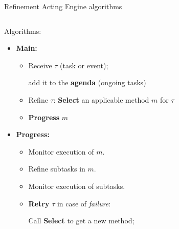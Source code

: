 \begin{frame}{Refinement Acting Engine algorithms}
    \begin{columns}[T]
  
        \begin{column}{0.65\textwidth}
            
            Algorithms:
            \small
            \begin{itemize}
                \setlength{\leftmargini}{-1pt}
                \item \textbf{Main:} 
                \begin{itemize}
                    \item Receive $\tau$ (task or event);
                    
                    add it to the \textbf{agenda} (ongoing tasks)
                    \item Refine $\tau$: \textbf{Select} an applicable method $m$ for $\tau$
                    \item \textbf{Progress} $m$
                \end{itemize}
                \item \textbf{Progress:}
                    \begin{itemize}
                        \item Monitor execution of $m$.
                        \item Refine subtasks in $m$.    
                        \item Monitor execution of subtasks.
                        \item \textbf{Retry} $\tau$ in case of \emph{failure}:
                    
                    Call \textbf{Select} to get a new method;
                    

\end{itemize}
\end{itemize}
\end{column}
\end{columns}
\end{frame}
